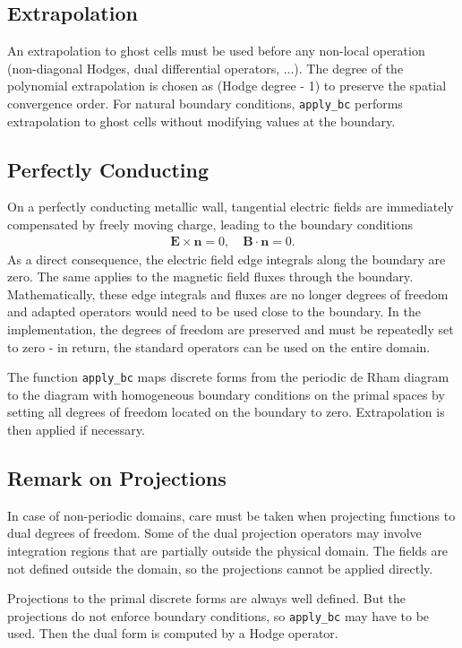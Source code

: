 \documentclass[11pt]{article}
\begin{document}
\subsection{Extrapolation}

An extrapolation to ghost cells must be used before any non-local operation (non-diagonal Hodges, dual differential operators, ...). The degree of the polynomial extrapolation is chosen as (Hodge degree - 1) to preserve the spatial convergence order. For natural boundary conditions, \verb|apply_bc| performs extrapolation to ghost cells without modifying values at the boundary. 

\subsection{Perfectly Conducting}

On a perfectly conducting metallic wall, tangential electric fields are immediately compensated by freely moving charge, leading to the boundary conditions
\begin{align}
    \boldsymbol{E} \times \boldsymbol{n} = 0, \quad \boldsymbol{B} \cdot \boldsymbol{n} = 0.
\end{align}
As a direct consequence, the electric field edge integrals along the boundary are zero. The same applies to the magnetic field fluxes through the boundary. Mathematically, these edge integrals and fluxes are no longer degrees of freedom and adapted operators would need to be used close to the boundary. In the implementation, the degrees of freedom are preserved and must be repeatedly set to zero - in return, the standard operators can be used on the entire domain.

The function \verb|apply_bc| maps discrete forms from the periodic de Rham diagram to the diagram with homogeneous boundary conditions on the primal spaces by setting all degrees of freedom located on the boundary to zero. Extrapolation is then applied if necessary.

\subsection{Remark on Projections}

In case of non-periodic domains, care must be taken when projecting functions to dual degrees of freedom. Some of the dual projection operators may involve integration regions that are partially outside the physical domain. The fields are not defined outside the domain, so the projections cannot be applied directly.

Projections to the primal discrete forms are always well defined. But the projections do not enforce boundary conditions, so \verb|apply_bc| may have to be used. Then the dual form is computed by a Hodge operator.
\end{document}
